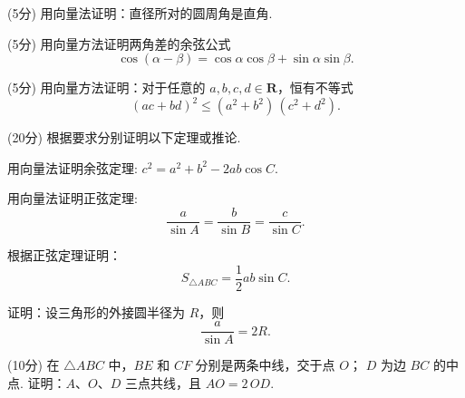 \documentclass[12pt, a4paper]{article}
\begin{document}
\begin{question}[resume]

    
    \item (5分) 用向量法证明：直径所对的圆周角是直角.
    \vspace*{15em}
    \item (5分) 用向量方法证明两角差的余弦公式
    \[
    \cos(\alpha - \beta) = \cos\alpha \cos\beta + \sin\alpha \sin\beta.
    \]\vspace*{15em}

    
    \item (5分) 用向量方法证明：对于任意的 $a,b,c,d\in\bm{R}$，恒有不等式
    \[
    (ac+bd)^2 \leq (a^2+b^2)\,(c^2+d^2).
    \]\vspace*{15em}
    \clearpage
    \item (20分) 根据要求分别证明以下定理或推论. 
    \begin{question}
        \item 用向量法证明余弦定理: $c^2=a^2+b^2-2ab\cos C$.
        \item 用向量法证明正弦定理: $$\frac{a}{\sin A}=\frac{b}{\sin B}=\frac{c}{\sin C}.$$
        \item 根据正弦定理证明：$$S_{\triangle ABC}=\frac{1}{2}ab\sin C.$$
        \item 证明：设三角形的外接圆半径为 $R$，则
        \[
        \frac{a}{\sin A}=2R.
        \]

    \end{question}\vspace*{20em}

    \item (10分) 在 $\triangle ABC$ 中，$BE$ 和 $CF$ 分别是两条中线，交于点 $O$；
    $D$ 为边 $BC$ 的中点. 证明：$A$、$O$、$D$ 三点共线，且 $ AO = 2\,OD.$


\end{question}
\end{document}
